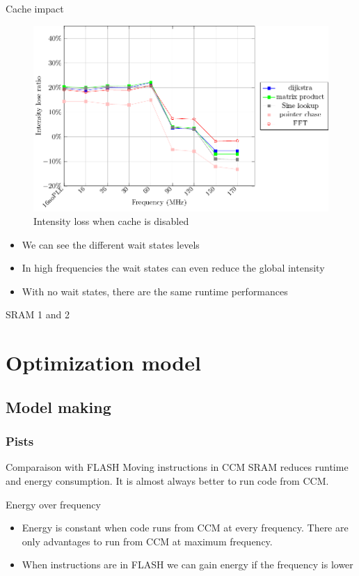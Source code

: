 \documentclass[
	11pt, %
]{beamer}
\begin{document}
\begin{frame}{Cache impact}
\begin{minipage}{0.5\textwidth}
\begin{figure}
			\includegraphics[scale = 0.3]{data/stm32g_v2/cache_impact/intensity.pdf}
			\caption{Intensity loss when cache is disabled}
		\end{figure}
		\vspace*{-0.5cm}
		\begin{itemize}
			\item We can see the different wait states levels
			\item In high frequencies the wait states can even reduce the global intensity
			\item With no wait states, there are the same runtime performances 
		\end{itemize}
	\end{minipage}
\end{frame}

\begin{frame}{SRAM 1 and 2}

\end{frame}

\section{Optimization model}

\subsection{Model making}
\begin{frame}
	\frametitle{Pists}
	\begin{block}{Comparaison with FLASH} %
		Moving instructions in CCM SRAM reduces runtime and energy consumption.
		It is almost always better to run code from CCM.
	\end{block}
	\begin{block}{Energy over frequency} %
		\begin{itemize}
			\item Energy is constant when code runs from CCM at every frequency. There are
			only advantages to run from CCM at maximum frequency.
			\item When instructions are in FLASH we can gain energy if the
			frequency is lower
		\end{itemize}
	\end{block}
\end{frame}
\end{document}
